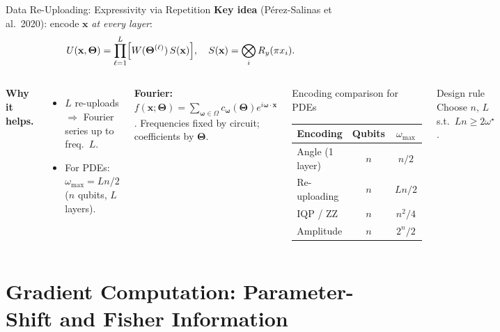 \documentclass[aspectratio=169,11pt]{beamer}
\newcommand{\bx}{\mathbf{x}}
\newcommand{\bTheta}{\boldsymbol{\Theta}}
\begin{document}
\begin{frame}{Data Re-Uploading: Expressivity via Repetition}
\small
  \textbf{Key idea} (P\'erez-Salinas et al.\ 2020): encode
  $\bx$ \emph{at every layer}:
  \[
    U(\bx,\bTheta) = \prod_{\ell=1}^{L}
      \Bigl[W(\bTheta^{(\ell)})\,S(\bx)\Bigr],
    \quad S(\bx) = \bigotimes_i R_y(\pi x_i).
  \]

  \begin{columns}[T]
    \textbf{Why it helps.}
    \begin{itemize}\itemsep1pt\small
      \item $L$ re-uploads $\Rightarrow$ Fourier series up to freq.\ $L$.
      \item For PDEs: $\omega_{\max} = Ln/2$ ($n$ qubits, $L$ layers).
    \end{itemize}
    \textbf{Fourier:} $f(\bx;\bTheta)
      = \sum_{\bm\omega\in\Omega}c_{\bm\omega}(\bTheta)e^{i\bm\omega\cdot\bx}$.
    Frequencies fixed by circuit; coefficients by $\bTheta$.
    \small
    \begin{block}{Encoding comparison for PDEs}
      \begin{center}
      \renewcommand{\arraystretch}{1.1}
      \begin{tabular}{lcc}
        \toprule
        \textbf{Encoding} & \textbf{Qubits} & $\omega_{\max}$ \\
        \midrule
        Angle (1 layer) & $n$   & $n/2$ \\
        Re-uploading    & $n$   & $Ln/2$ \\
        IQP / ZZ        & $n$   & $n^2/4$ \\
        Amplitude       & $n$   & $2^n/2$ \\
        \bottomrule
      \end{tabular}
      \end{center}
    \end{block}
    \begin{alertblock}{Design rule}
      Choose $n$, $L$ s.t.\ $Ln \geq 2\omega^\star$.
    \end{alertblock}
  \end{columns}
\end{frame}

\section{Gradient Computation: Parameter-Shift and Fisher Information}
\end{document}

